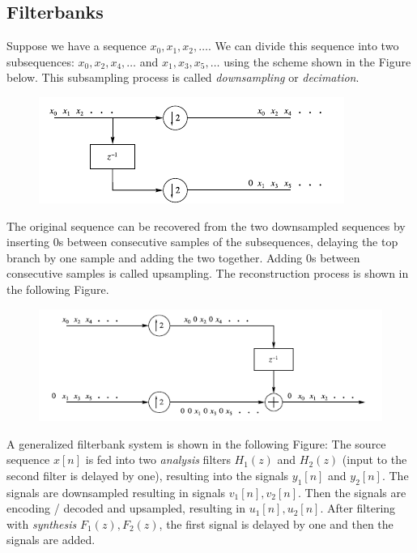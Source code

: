 \subsection{Filterbanks}

Suppose we have a sequence $x_0, x_1, x_2 , \ldots$. We can divide this sequence into two subsequences: $x_0, x_2, x_4, \ldots$ and $x_1, x_3, x_5, \ldots$ using the scheme shown in the Figure below. This subsampling process is called \emph{downsampling} or \emph{decimation}.

\begin{figure}[H]
    \centering
    \includegraphics[scale=0.7]{images/2021-11-09-subband_02.png}
\end{figure}



The original sequence can be recovered from the two downsampled sequences by inserting $0$s between consecutive samples of the subsequences, delaying the top branch by one sample and adding the two together. Adding $0$s between consecutive samples is called upsampling. The reconstruction process is shown in the following Figure.

\begin{figure}[H]
    \centering
    \includegraphics[scale=0.7]{images/2021-11-09-subband_03.png}
\end{figure}


A generalized filterbank system is shown in the following Figure: The source sequence $x[n]$ is fed into two \emph{analysis} filters $H_1(z)$ and $H_2(z)$ (input to the second filter is delayed by one), resulting into the signals $y_1[n]$ and $y_2[n]$. The signals are downsampled resulting in signals $v_1[n], v_2[n]$. Then the signals are encoding / decoded and upsampled, resulting in $u_1[n], u_2[n]$. After filtering with \emph{synthesis} $F_1(z), F_2(z)$, the first signal is delayed by one and then the signals are added.


